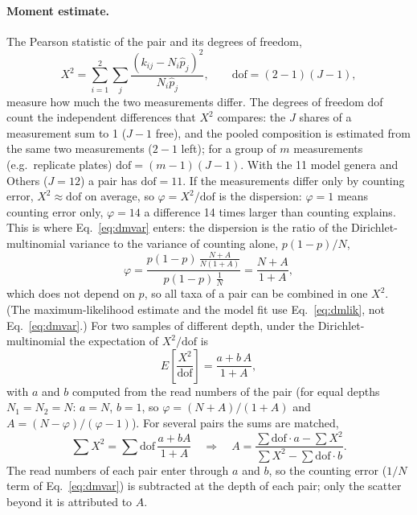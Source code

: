 \documentclass[11pt,a4paper]{article}
\begin{document}
\paragraph{Moment estimate.} The Pearson statistic of the pair and its degrees of freedom,
\begin{equation*}
X^2 = \sum_{i=1}^{2}\sum_j \frac{(k_{ij} - N_i \hat p_j)^2}{N_i \hat p_j}, \qquad \mathrm{dof} = (2-1)(J-1),
\end{equation*}
measure how much the two measurements differ. The degrees of freedom dof count the independent differences that $X^2$ compares: the $J$ shares of a measurement sum to 1 ($J-1$ free), and the pooled composition is estimated from the same two measurements ($2-1$ left); for a group of $m$ measurements (e.g.\ replicate plates) $\mathrm{dof} = (m-1)(J-1)$. With the 11 model genera and Others ($J = 12$) a pair has $\mathrm{dof} = 11$. If the measurements differ only by counting error, $X^2 \approx \mathrm{dof}$ on average, so $\varphi = X^2/\mathrm{dof}$ is the dispersion: $\varphi = 1$ means counting error only, $\varphi = 14$ a difference 14 times larger than counting explains. This is where Eq.~\eqref{eq:dmvar} enters: the dispersion is the ratio of the Dirichlet-multinomial variance to the variance of counting alone, $p(1-p)/N$,
\begin{equation*}
\varphi = \frac{p(1-p)\,\frac{N+A}{N(1+A)}}{p(1-p)\,\frac{1}{N}} = \frac{N+A}{1+A},
\end{equation*}
which does not depend on $p$, so all taxa of a pair can be combined in one $X^2$. (The maximum-likelihood estimate and the model fit use Eq.~\eqref{eq:dmlik}, not Eq.~\eqref{eq:dmvar}.) For two samples of different depth, under the Dirichlet-multinomial the expectation of $X^2/\mathrm{dof}$ is
\begin{equation*}
E\!\left[\frac{X^2}{\mathrm{dof}}\right] = \frac{a + b\,A}{1 + A},
\end{equation*}
with $a$ and $b$ computed from the read numbers of the pair (for equal depths $N_1 = N_2 = N$: $a = N$, $b = 1$, so $\varphi = (N + A)/(1 + A)$ and $A = (N - \varphi)/(\varphi - 1)$). For several pairs the sums are matched,
\begin{equation*}
\sum X^2 = \sum \mathrm{dof}\,\frac{a + bA}{1 + A} \quad\Longrightarrow\quad A = \frac{\sum \mathrm{dof}\cdot a - \sum X^2}{\sum X^2 - \sum \mathrm{dof}\cdot b}.
\end{equation*}
The read numbers of each pair enter through $a$ and $b$, so the counting error ($1/N$ term of Eq.~\eqref{eq:dmvar}) is subtracted at the depth of each pair; only the scatter beyond it is attributed to $A$.
\end{document}
